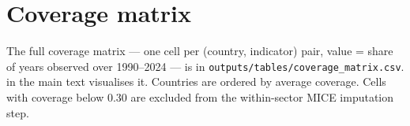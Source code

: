 \section{Coverage matrix}\label{app:coverage}

The full coverage matrix --- one cell per (country, indicator) pair, value = share of years observed over 1990--2024 --- is in \texttt{outputs/tables/coverage\_matrix.csv}.  in the main text visualises it. Countries are ordered by average coverage. Cells with coverage below 0.30 are excluded from the within-sector MICE imputation step.
